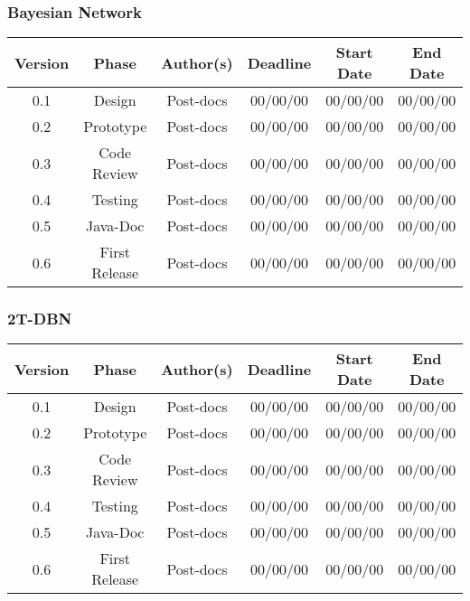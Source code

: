 \subsubsection*{Bayesian Network}

\begin{table}[H]
\begin{tabular}{cccccc}
\hline
\textbf{Version} & \textbf{Phase} & \textbf{Author(s)} & \textbf{Deadline} & \textbf{Start Date} & \textbf{End Date}\\
\hline
0.1 & Design & Post-docs & 00/00/00 & 00/00/00 & 00/00/00\\
\hline 
0.2 & Prototype & Post-docs & 00/00/00 & 00/00/00 & 00/00/00\\
\hline 
0.3 & Code Review & Post-docs & 00/00/00 & 00/00/00 & 00/00/00\\
\hline 
0.4 & Testing & Post-docs & 00/00/00 & 00/00/00 & 00/00/00\\
\hline 
0.5 & Java-Doc  & Post-docs & 00/00/00 & 00/00/00 & 00/00/00\\
\hline 
0.6 & First Release & Post-docs & 00/00/00 & 00/00/00 & 00/00/00\\
\hline
\end{tabular}
\end{table}

\subsubsection*{2T-DBN}

\begin{table}[H]
\begin{tabular}{cccccc}
\hline
\textbf{Version} & \textbf{Phase} & \textbf{Author(s)} & \textbf{Deadline} & \textbf{Start Date} & \textbf{End Date}\\
\hline
0.1 & Design & Post-docs & 00/00/00 & 00/00/00 & 00/00/00\\
\hline 
0.2 & Prototype & Post-docs & 00/00/00 & 00/00/00 & 00/00/00\\
\hline 
0.3 & Code Review & Post-docs & 00/00/00 & 00/00/00 & 00/00/00\\
\hline 
0.4 & Testing & Post-docs & 00/00/00 & 00/00/00 & 00/00/00\\
\hline 
0.5 & Java-Doc  & Post-docs & 00/00/00 & 00/00/00 & 00/00/00\\
\hline 
0.6 & First Release & Post-docs & 00/00/00 & 00/00/00 & 00/00/00\\
\hline
\end{tabular}
\end{table}


